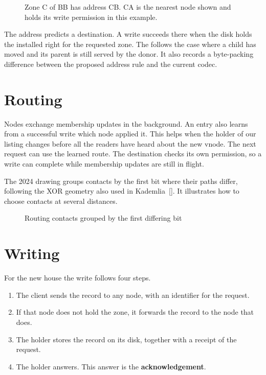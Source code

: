 \documentclass[11pt]{article}
\begin{document}
\begin{figure}[H]
    \centering
    \caption{Zone C of BB has address CB. CA is the nearest node shown and holds its write permission in this example.}
\end{figure}

The address predicts a destination. A write succeeds there when the disk holds the installed right for the requested zone. The  follows the case where a child has moved and its parent is still served by the donor. It also records a byte-packing difference between the proposed address rule and the current codec.

\section{Routing}
Nodes exchange membership updates in the background. An entry also learns from a successful write which node applied it. This helps when the holder of our listing changes before all the readers have heard about the new vnode. The next request can use the learned route. The destination checks its own permission, so a write can complete while membership updates are still in flight.

The 2024 drawing groups contacts by the first bit where their paths differ, following the XOR geometry also used in Kademlia~[]. It illustrates how to choose contacts at several distances.

\begin{figure}[H]
    \centering
    \caption{Routing contacts grouped by the first differing bit}
\end{figure}

\section{Writing}
For the new house the write follows four steps.
\begin{enumerate}[leftmargin=1.5em,itemsep=1pt]
  \item The client sends the record to any node, with an identifier for the request.
  \item If that node does not hold the zone, it forwards the record to the node that does.
  \item The holder stores the record on its disk, together with a receipt of the request.
  \item The holder answers. This answer is the \textbf{acknowledgement}.
\end{enumerate}
\end{document}
